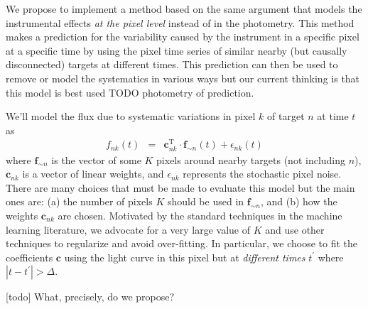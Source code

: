 \documentclass[letterpaper,12pt,preprint]{hack_aastex}
\newcommand{\bvec}[1]{{\ensuremath{{\boldsymbol{#1}}}}}
\begin{document}
We propose to implement a method based on the same argument that models the
instrumental effects \emph{at the pixel level} instead of in the photometry.
This method makes a prediction for the variability caused by the instrument in
a specific pixel at a specific time by using the pixel time series of similar
nearby (but causally disconnected) targets at different times.
This prediction can then be used to remove or model the systematics in various
ways but our current thinking is that this model is best used TODO photometry
of prediction.

We'll model the flux due to systematic variations in pixel $k$ of target
$n$ at time $t$ as
\begin{eqnarray}
f_{nk}(t) &=& \bvec{c}_{nk}^\mathrm{T}\cdot\bvec{f}_{\sim n}(t)
              + \epsilon_{nk}(t)
\end{eqnarray}
where $\bvec{f}_{\sim n}$ is the vector of some $K$ pixels around nearby
targets (not including $n$), $\bvec{c}_{nk}$ is a vector of linear weights,
and $\epsilon_{nk}$ represents the stochastic pixel noise.
There are many choices that must be made to evaluate this model but the main
ones are: (a) the number of pixels $K$ should be used in $\bvec{f}_{\sim n}$,
and (b) how the weights $\bvec{c}_{nk}$ are chosen.
Motivated by the standard techniques in the machine learning literature, we
advocate for a very large value of $K$ and use other techniques to regularize
and avoid over-fitting.
In particular, we choose to fit the coefficients $\bvec{c}$ using the light
curve in this pixel but at \emph{different times} $t^\prime$ where
$|t-t^\prime| > \Delta$.


[todo] What, precisely, do we propose?
\end{document}
